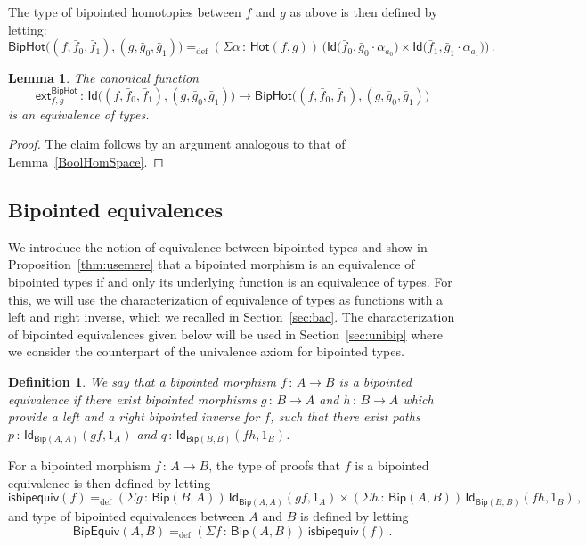 \documentclass[10pt,a4paper,oneside,reqno]{amsart}
\numberwithin{equation}{section}
\theoremstyle{mythm}
\newtheorem{lemma}[theorem]{Lemma}
\theoremstyle{mydef}
\newtheorem{definition}[theorem]{Definition}
\theoremstyle{myrmk}
\newcommand{\ie}{\text{i.e.\ }}
\newcommand{\myemph}[1]{\textit{#1}}
\newcommand{\defeq}{=_{\mathrm{def}}}
\newcommand{\co}{\,{:}\,}
\newcommand{\ct}{\cdot}
\newcommand{\Hot}{\mathsf{Hot}}
\newcommand{\ext}{\mathsf{ext}}
\newcommand{\Id}{\mathsf{Id}}
\newcommand{\Bip}{\mathsf{Bip}}
\newcommand{\BipHom}{\mathsf{Bip}}
\newcommand{\BipHot}{\mathsf{BipHot}}
\newcommand{\isbipequiv}{\mathsf{isbipequiv}}
\newcommand{\BipEquiv}{\mathsf{BipEquiv}}
\begin{document}
The type of bipointed homotopies between $f$ and $g$ as above is then defined by letting:
\[
\BipHot \big( (f, \bar{f}_0, \bar{f}_1), (g, \bar{g}_0, \bar{g}_1) \big) \defeq
(\Sigma \alpha \co \Hot( f, g)) \, \big( 
\Id\big( \bar{f}_0 ,   \bar{g}_0 \ct \alpha_{a_0}  \big) \times 
  \Id \big( \bar{f}_1,    \bar{g}_1 \ct \alpha_{a_1}  \big) \big)   \, .
\]


\begin{lemma} \label{thm:biphot}
The canonical function
\[
\ext^{\BipHot}_{f,g} \co \Id\big( (f, \bar{f}_0, \bar{f}_1), (g, \bar{g}_0, \bar{g}_1) \big) \rightarrow
\BipHot \big( (f, \bar{f}_0, \bar{f}_1), (g, \bar{g}_0, \bar{g}_1) \big) 
\]
is an equivalence of types. 
\end{lemma}


\begin{proof} The claim follows by an argument analogous to that of Lemma~\ref{BoolHomSpace}.
\end{proof}




\subsection*{Bipointed equivalences} We introduce the notion of equivalence between bipointed types and show
in Proposition~\ref{thm:usemere}  that a bipointed morphism is an equivalence of bipointed types if and only its underlying function is an equivalence of types. For this, we will use the characterization of equivalence of types
as functions with a left and right inverse, which we recalled in Section~\ref{sec:bac}. The characterization of
bipointed equivalences given below will be used in Section~\ref{sec:unibip} where we consider the counterpart of the univalence axiom for bipointed types. 



\begin{definition} We say that a bipointed morphism $f \co A \to B$ is a \myemph{bipointed equivalence}
if there exist bipointed morphisms $g \co B \to A$ and $h \co B \to A$ which provide a left and a right bipointed inverse for $f$, \ie such that there exist paths $p \co \Id_{\Bip(A,A)}(g  f, 1_A)$ 
and $q \co \Id_{\Bip(B,B)} ( f  h, 1_B)$.
\end{definition}

For a bipointed morphism $f \co A \to B$, the type of proofs that $f$ is a bipointed equivalence is
then defined by letting
\[
\isbipequiv(f) \defeq   (\Sigma g \co \BipHom(B,A)) \,  \Id_{\Bip(A,A)}( g  f, 1_A ) \times 
    (\Sigma h \co \BipHom(A, B)) \, \Id_{\Bip(B,B)} (f  h , 1_B ) \, ,
\]
and type of bipointed equivalences between $A$ and $B$ is defined by letting
\[
\BipEquiv(A, B)
\defeq    
(\Sigma f \co \BipHom(A,B)) \, \isbipequiv(f)  \, . 
\] 
\end{document}
